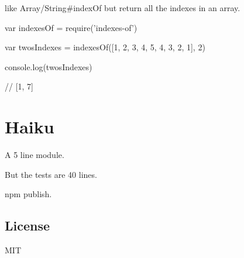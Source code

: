 like Array/\+String\#index\+Of but return all the indexes in an array.


\begin{DoxyCode}
var indexesOf = require('indexes-of')

var twosIndexes = indexesOf([1, 2, 3, 4, 5, 4, 3, 2, 1], 2)

console.log(twosIndexes)

// [1, 7]
\end{DoxyCode}


\section*{Haiku}


\begin{DoxyItemize}
\item A 5 line module.
\item But the tests are 40 lines.
\item npm publish.
\end{DoxyItemize}

\subsection*{License}

M\+IT 